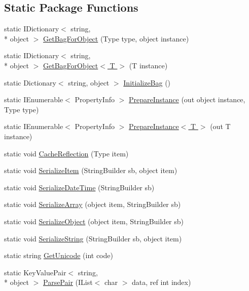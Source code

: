 \subsection*{Static Package Functions}
\begin{DoxyCompactItemize}
\item 
static I\-Dictionary$<$ string, \\*
object $>$ \hyperlink{a00046_a3589b9943dbb8872cd4030d4b9ff1a7a}{Get\-Bag\-For\-Object} (Type type, object instance)
\item 
static I\-Dictionary$<$ string, \\*
object $>$ \hyperlink{a00046_a9ce835f1af37bfb8f65176a0d3185d69}{Get\-Bag\-For\-Object$<$ T $>$} (T instance)
\item 
static Dictionary$<$ string, object $>$ \hyperlink{a00046_a9f62c2e79312364d7161b13a64b89c8e}{Initialize\-Bag} ()
\item 
static I\-Enumerable$<$ Property\-Info $>$ \hyperlink{a00046_ab61372226682d7b1d17f54345dfd17b5}{Prepare\-Instance} (out object instance, Type type)
\item 
static I\-Enumerable$<$ Property\-Info $>$ \hyperlink{a00046_a48baaa0a217d05b48e049a4c5f2784a9}{Prepare\-Instance$<$ T $>$} (out T instance)
\item 
static void \hyperlink{a00046_a1bb8d04c0c686da8bf81c0b273cc0591}{Cache\-Reflection} (Type item)
\item 
static void \hyperlink{a00046_a1ce11382c35fcbc0902e73deec3e617b}{Serialize\-Item} (String\-Builder sb, object item)
\item 
static void \hyperlink{a00046_a6874a321c86a87ddeafb25e1f5b37a42}{Serialize\-Date\-Time} (String\-Builder sb)
\item 
static void \hyperlink{a00046_a38298480de46941b764cbbae3ec00ac0}{Serialize\-Array} (object item, String\-Builder sb)
\item 
static void \hyperlink{a00046_a2a63df270c38b1c9ce7de54b268cdc4f}{Serialize\-Object} (object item, String\-Builder sb)
\item 
static void \hyperlink{a00046_a9322c1bf740844d26a732c091004063f}{Serialize\-String} (String\-Builder sb, object item)
\item 
static string \hyperlink{a00046_a03595e6253700fbdb86440704e1f2e66}{Get\-Unicode} (int code)
\item 
static Key\-Value\-Pair$<$ string, \\*
object $>$ \hyperlink{a00046_a59a67256e67e7a4edd4c9905ecd1aec8}{Parse\-Pair} (I\-List$<$ char $>$ data, ref int index)

\end{DoxyCompactItemize}
